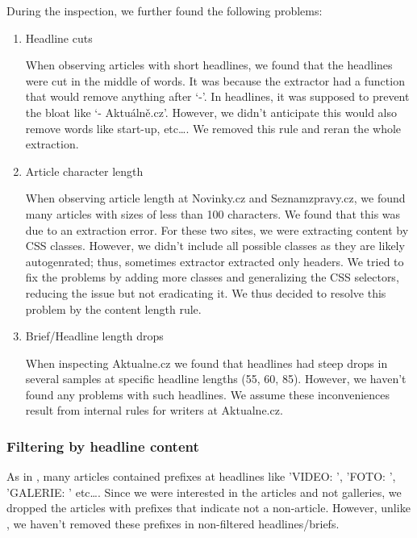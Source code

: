 During the inspection, we further found the following problems:
\begin{enumerate}
    \item Headline cuts

          When observing articles with short headlines, we found that the headlines
          were cut in the middle of words.
          It was because the extractor had a function that would remove anything after `-'.
          In headlines, it was supposed to prevent the bloat like `- Aktuálně.cz'. However,
          we didn't anticipate this would also remove words like start-up, etc\dots.
          We removed this rule and reran the whole extraction.
    \item Article character length

          When observing article length at Novinky.cz and Seznamzpravy.cz,
          we found many articles with sizes of less than 100 characters.
          We found that this was due to an extraction error.
          For these two sites, we were extracting content by CSS classes.
          However, we didn't include all possible classes as they are likely autogenrated;
          thus, sometimes extractor extracted only headers.
          We tried to fix the problems by adding more classes and generalizing the CSS selectors,
          reducing the issue but not eradicating it. We thus decided to resolve this problem
          by the content length rule.

    \item Brief/Headline length drops

          When inspecting Aktualne.cz we found that headlines
          had steep drops in several samples at specific headline lengths (55, 60, 85).
          However, we haven't found any problems with such headlines.
          We assume these inconveniences result from internal rules for writers at Aktualne.cz.
\end{enumerate}

\subsubsection{Filtering by headline content}
As in \cite{strakaSumeCzechLargeCzech2018a}, many articles
contained prefixes at headlines like 'VIDEO: ', 'FOTO: ', 'GALERIE: ' etc\dots.
Since we were interested in the articles and not galleries,
we dropped the articles with prefixes that indicate not a non-article.
However, unlike \cite{strakaSumeCzechLargeCzech2018a}, we haven't removed these prefixes
in non-filtered headlines/briefs.




